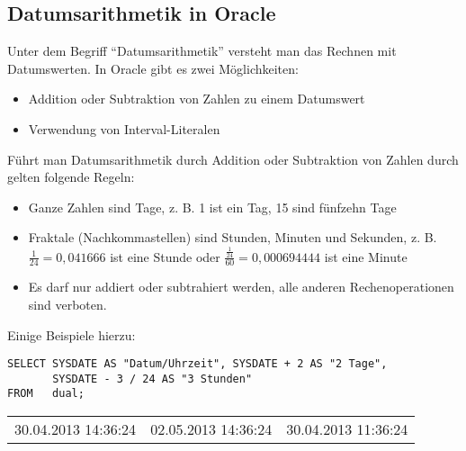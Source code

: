       \subsection{Datumsarithmetik in Oracle}
        Unter dem Begriff \enquote{Datumsarithmetik} versteht man das Rechnen mit Datumswerten. In Oracle gibt es zwei Möglichkeiten:
        \begin{itemize}
          \item Addition oder Subtraktion von Zahlen zu einem Datumswert
          \item Verwendung von Interval-Literalen
        \end{itemize}
        Führt man Datumsarithmetik durch Addition oder Subtraktion von Zahlen durch gelten folgende Regeln:
        \begin{itemize}
          \item Ganze Zahlen sind Tage, z. B. 1 ist ein Tag, 15 sind fünfzehn Tage
          \item Fraktale (Nachkommastellen) sind Stunden, Minuten und Sekunden, z. B. $\frac{1}{24}=0,041666$ ist eine Stunde oder $\frac{\frac{1}{24}}{60}=0,000694444$ ist eine Minute
          \item Es darf nur addiert oder subtrahiert werden, alle anderen Rechenoperationen sind verboten.
        \end{itemize}
        Einige Beispiele hierzu:
        \begin{lstlisting}[language=oracle_sql,caption={Einfache Datumsarithmetik in Oracle},label=sql03_19]
SELECT SYSDATE AS "Datum/Uhrzeit", SYSDATE + 2 AS "2 Tage",
       SYSDATE - 3 / 24 AS "3 Stunden"
FROM   dual;
        \end{lstlisting}
        \begin{center}
          \begin{small}
            \tablehead{}
            \tabletail {
            }
            \begin{oraclesql}
              \begin{supertabular}{lll}
                30.04.2013 14:36:24 & 02.05.2013 14:36:24 & 30.04.2013 11:36:24 \\
              \end{supertabular}
            \end{oraclesql}
          \end{small}
        \end{center}
